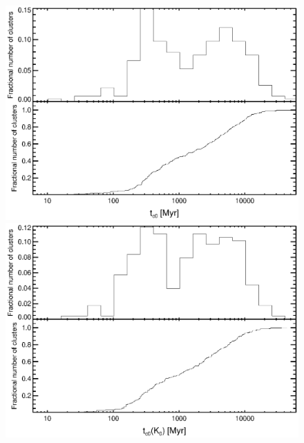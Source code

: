 \clearpage
\begin{figure}[htp]
  \begin{center}
    \begin{minipage}[htp]{0.8\linewidth}
      \includegraphics*[width=\textwidth, trim=20mm 10mm 10mm 10mm, clip]{t0.eps}
    \end{minipage}
    \begin{minipage}[htp]{0.8\linewidth}
      \includegraphics*[width=\textwidth, trim=20mm 10mm 10mm 10mm, clip]{k0cool.eps}
    \end{minipage}

\end{center}
\end{figure}

